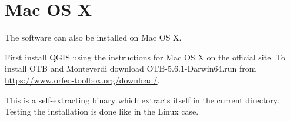 \documentclass[10pt,a4paper]{article}
\begin{document}
\clearpage
\section{Mac OS X}

The software can also be installed on Mac OS X.

First install QGIS using the instructions for Mac OS X on the official site. To install OTB and  Monteverdi download 
OTB-5.6.1-Darwin64.run from \url{https://www.orfeo-toolbox.org/download/}.

This is a self-extracting binary which extracts itself in the current directory. Testing the installation is done like in the Linux case.
\end{document}
